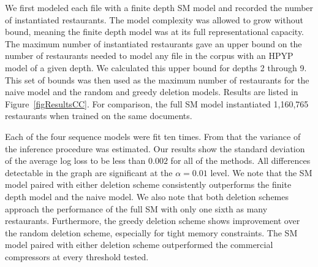 
We first modeled each file with a finite depth SM model and recorded the number of instantiated restaurants.  The model complexity was allowed to grow without bound, meaning the finite depth model was at its full representational capacity.  The maximum number of instantiated restaurants gave an upper bound on the number of restaurants needed to model any file in the corpus with an HPYP model of a given depth.  We calculated this upper bound for depths 2 through 9.  This set of bounds was then used as the maximum number of restaurants for the naive model and the random and greedy deletion models.  Results are listed in Figure~\ref{figResultsCC}.  For comparison, the full SM model instantiated 1,160,765 restaurants when trained on the same documents.  

Each of the four sequence models were fit ten times.  From that the variance of the inference procedure was estimated.  Our results show the standard deviation of the average log loss to be less than $0.002$ for all of the methods.  All differences detectable in the graph are significant at the $\alpha = 0.01$ level. We note that the SM model paired with either deletion scheme consistently outperforms the finite depth model and the naive model.  We also note that both deletion schemes approach the performance of the full SM with only one sixth as many restaurants.  Furthermore, the greedy deletion scheme shows improvement over the random deletion scheme, especially for tight memory constraints.  The SM model paired with either deletion scheme outperformed the commercial compressors at every threshold tested.
